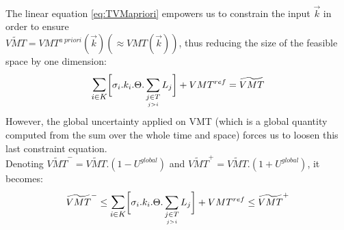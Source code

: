 \\
The linear equation \ref{eq:TVMapriori} empowers us to constrain the input $\vec{k}$ in order to ensure\\ $\widetilde{VMT}=VMT^{a\ priori}(\vec{k})(\approx VMT(\vec{k}))$, thus reducing the size of the feasible space by one dimension:
\begin{equation*}
	\mathlarger{\sum\limits_{i\in K}}\biggl[\sigma_{i}.k_{i}.\Theta.	\sum\limits_{\underset{j>i}{j\in T}}L_{j}\biggr]+VMT^{ref}=\widetilde{VMT}
\end{equation*}
However, the global uncertainty applied on VMT (which is a global quantity computed from the sum over the whole time and space) forces us to loosen this last constraint equation.\\
Denoting $\widetilde{VMT}^{-}=\widetilde{VMT}.(1-U^{global})$ and $\widetilde{VMT}^{+}=\widetilde{VMT}.(1+U^{global})$, it becomes:\\
\begin{equation}	
	\label{eq:TVMineq}
	\widetilde{VMT}^{-}\leq\mathlarger{\sum\limits_{i\in K}}\biggl[\sigma_{i}.k_{i}.\Theta.	\sum\limits_{\underset{j>i}{j\in T}}L_{j}\biggr]+VMT^{ref}\leq \widetilde{VMT}^{+}
\end{equation} 